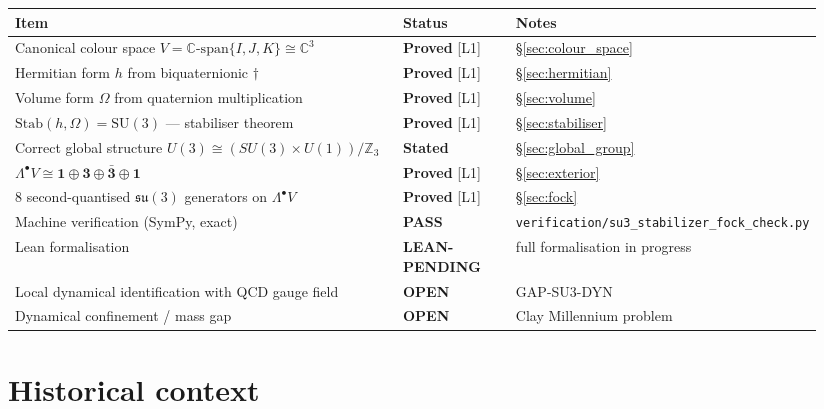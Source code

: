 \documentclass[12pt,a4paper]{article}
\theoremstyle{definition}
\theoremstyle{remark}
\begin{document}
\begin{statusbox}
\begin{tabular}{@{}p{0.56\linewidth}p{0.15\linewidth}p{0.23\linewidth}@{}}
\toprule
Item & Status & Notes \\
\midrule
Canonical colour space $V=\mathbb{C}\text{-span}\{I,J,K\}\cong\mathbb{C}^3$
  & \textbf{Proved} [L1] & \S\ref{sec:colour_space}\\
Hermitian form $h$ from biquaternionic $\dagger$
  & \textbf{Proved} [L1] & \S\ref{sec:hermitian}\\
Volume form $\Omega$ from quaternion multiplication
  & \textbf{Proved} [L1] & \S\ref{sec:volume}\\
$\mathrm{Stab}(h,\Omega)=\mathrm{SU}(3)$ — stabiliser theorem
  & \textbf{Proved} [L1] & \S\ref{sec:stabiliser}\\
Correct global structure $U(3)\cong(SU(3)\times U(1))/\mathbb{Z}_3$
  & \textbf{Stated} & \S\ref{sec:global_group}\\
$\Lambda^\bullet V\cong\mathbf{1}\oplus\mathbf{3}\oplus\bar{\mathbf{3}}\oplus\mathbf{1}$
  & \textbf{Proved} [L1] & \S\ref{sec:exterior}\\
$8$ second-quantised $\mathfrak{su}(3)$ generators on $\Lambda^\bullet V$
  & \textbf{Proved} [L1] & \S\ref{sec:fock}\\
Machine verification (SymPy, exact)
  & \textbf{PASS} & \texttt{verification/su3\_stabilizer\_fock\_check.py}\\
Lean formalisation
  & \textbf{LEAN-PENDING} & full formalisation in progress\\
\midrule
Local dynamical identification with QCD gauge field
  & \textbf{OPEN} & GAP-SU3-DYN\\
Dynamical confinement / mass gap
  & \textbf{OPEN} & Clay Millennium problem\\
\bottomrule
\end{tabular}
\end{statusbox}

\section{Historical context}
\label{sec:history}
\end{document}

